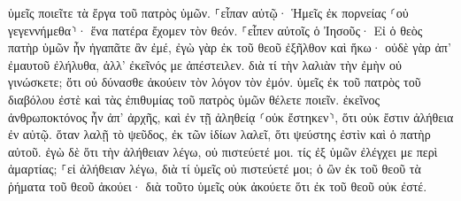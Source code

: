 \documentclass{openreader}
\begin{document}
ὑμεῖς ποιεῖτε τὰ ἔργα τοῦ πατρὸς ὑμῶν. ⸀εἶπαν αὐτῷ· Ἡμεῖς ἐκ πορνείας ⸂οὐ γεγεννήμεθα⸃· ἕνα πατέρα ἔχομεν τὸν θεόν. 
⸀εἶπεν αὐτοῖς ὁ Ἰησοῦς· Εἰ ὁ θεὸς πατὴρ ὑμῶν ἦν ἠγαπᾶτε ἂν ἐμέ, ἐγὼ γὰρ ἐκ τοῦ θεοῦ ἐξῆλθον καὶ ἥκω· οὐδὲ γὰρ ἀπ’ ἐμαυτοῦ ἐλήλυθα, ἀλλ’ ἐκεῖνός με ἀπέστειλεν. 
διὰ τί τὴν λαλιὰν τὴν ἐμὴν οὐ γινώσκετε; ὅτι οὐ δύνασθε ἀκούειν τὸν λόγον τὸν ἐμόν. 
ὑμεῖς ἐκ τοῦ πατρὸς τοῦ διαβόλου ἐστὲ καὶ τὰς ἐπιθυμίας τοῦ πατρὸς ὑμῶν θέλετε ποιεῖν. ἐκεῖνος ἀνθρωποκτόνος ἦν ἀπ’ ἀρχῆς, καὶ ἐν τῇ ἀληθείᾳ ⸂οὐκ ἔστηκεν⸃, ὅτι οὐκ ἔστιν ἀλήθεια ἐν αὐτῷ. ὅταν λαλῇ τὸ ψεῦδος, ἐκ τῶν ἰδίων λαλεῖ, ὅτι ψεύστης ἐστὶν καὶ ὁ πατὴρ αὐτοῦ. 
ἐγὼ δὲ ὅτι τὴν ἀλήθειαν λέγω, οὐ πιστεύετέ μοι. 
τίς ἐξ ὑμῶν ἐλέγχει με περὶ ἁμαρτίας; ⸀εἰ ἀλήθειαν λέγω, διὰ τί ὑμεῖς οὐ πιστεύετέ μοι; 
ὁ ὢν ἐκ τοῦ θεοῦ τὰ ῥήματα τοῦ θεοῦ ἀκούει· διὰ τοῦτο ὑμεῖς οὐκ ἀκούετε ὅτι ἐκ τοῦ θεοῦ οὐκ ἐστέ. 
\end{document}
